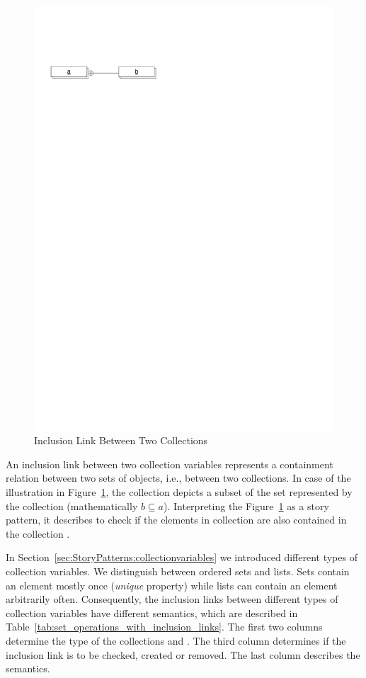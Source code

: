 \begin{figure}[htb]
  \centering
  \includegraphics[scale=0.8]{figures/InclusionLinksSetsCheck}
  \caption{Inclusion Link Between Two Collections}
  \label{fig:InlucionLinkCollections}
\end{figure}

An inclusion link between two collection variables represents a containment relation between two sets of objects, i.e., between two collections.
In case of the illustration in Figure~\ref{fig:InlucionLinkCollections},
the collection  depicts a subset of the set represented by the collection  (mathematically $b \subseteq a$).
Interpreting the Figure~\ref{fig:InlucionLinkCollections} as a story pattern,
it describes to check if the elements in collection  are also contained in the collection .

In Section~\ref{sec:StoryPatterns:collectionvariables} we introduced different types of collection variables.
We distinguish between ordered sets and lists.
Sets contain an element mostly once (\emph{unique} property) while lists can contain an element arbitrarily often.
Consequently, the inclusion links between different types of collection variables have different semantics,
which are described in Table~\ref{tab:set_operations_with_inclusion_links}.
The first two columns determine the type of the collections  and .
The third column determines if the inclusion link is to be checked, created or removed.
The last column describes the semantics.

